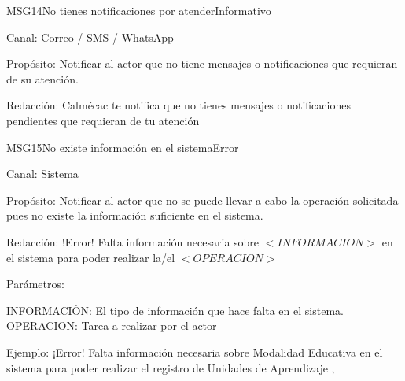 \begin{mensaje}{MSG14}{No tienes notificaciones por atender}{Informativo}
	\item[Canal:] Correo / SMS / WhatsApp
	\item[Propósito:] Notificar al actor que no tiene mensajes o notificaciones que requieran de su atención.
	\item[Redacción:] Calmécac te notifica que no tienes mensajes o notificaciones pendientes que requieran de tu atención
\end{mensaje}

\begin{mensaje}{MSG15}{No	 existe información en el sistema}{Error}
	\item[Canal:] Sistema
	\item[Propósito:] Notificar al actor que no se puede llevar a cabo la operación solicitada pues no existe la información suficiente en el sistema.
	\item[Redacción:] !Error! Falta información necesaria sobre $<INFORMACION>$ en el sistema para poder realizar la/el $<OPERACION>$ \\
	\item[Parámetros:] 
	\begin{Titemize}
		\Titem INFORMACIÓN: El tipo de información que hace falta en el sistema.
		\Titem OPERACION: Tarea a realizar por el actor
	\end{Titemize}
	\item[Ejemplo:] ¡Error! Falta información necesaria sobre Modalidad Educativa en el sistema para poder realizar el registro de Unidades de Aprendizaje
	, 
\end{mensaje}

